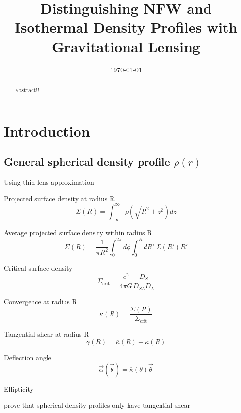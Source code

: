 \documentclass[]{article}
\begin{document}
\title{Distinguishing NFW and Isothermal Density Profiles with Gravitational Lensing}
\author{}
\date{\today}
\maketitle

\begin{abstract}
abstract!!
\end{abstract}

\section{Introduction}

\subsection{General spherical density profile $\rho(r)$}
Using thin lens approximation

Projected surface density at radius R
\begin{equation}
    \Sigma(R) = \int_{-\infty}^{\infty}{\rho(\sqrt{R^2 + z^2}) dz}
\end{equation}

Average projected surface density within radius R
\begin{equation}
    \overline{\Sigma}(R) = \frac{1}{\pi R^2} \int_0^{2\pi}{d\phi \int_0^{R}{dR'~\Sigma(R')R'}}
\end{equation}

Critical surface density
\begin{equation}
    \Sigma_\mathrm{crit} = \frac{c^2}{4\pi G} \frac{D_S}{D_{SL} D_L}
\end{equation}

Convergence at radius R
\begin{equation}
    \kappa(R) = \frac{\Sigma(R)}{\Sigma_\mathrm{crit}}
\end{equation}

Tangential shear at radius R
\begin{equation}
    \gamma(R) = \overline{\kappa}(R) - \kappa(R)
\end{equation}

Deflection angle
\begin{equation}
    \vec{\alpha}(\vec{\theta}) = \overline{\kappa}(\theta)\vec{\theta}
\end{equation}

Ellipticity


prove that spherical density profiles only have tangential shear
\end{document}
